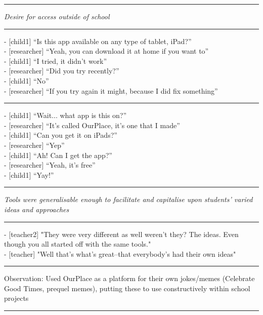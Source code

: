 \par\noindent\rule{\textwidth}{1pt}

\textit{Desire for access outside of school}

\par\noindent\rule{\textwidth}{1pt}

- [child1] “Is this app available on any type of tablet, iPad?”\\
- [researcher] “Yeah, you can download it at home if you want to”\\
- [child1] “I tried, it didn’t work”\\
- [researcher] “Did you try recently?”\\
- [child1] “No”\\
- [researcher] “If you try again it might, because I did fix something”

{\centering
  \noindent\rule{0.5\textwidth}{0.4pt}\par
}

- [child1] “Wait... what app is this on?”\\
- [researcher] “It’s called OurPlace, it’s one that I made”\\
- [child1] “Can you get it on iPads?”\\
- [researcher] “Yep”\\
- [child1] “Ah! Can I get the app?”\\
- [researcher] “Yeah, it’s free”\\
- [child1] “Yay!”

\par\noindent\rule{\textwidth}{1pt}

\textit{Tools were generalisable enough to facilitate and capitalise upon students’ varied ideas and approaches}

\par\noindent\rule{\textwidth}{1pt}

- [teacher2] "They were very different as well weren't they? The ideas. Even though you all started off with the same tools."\\
- [teacher] "Well that's what's great--that everybody's had their own ideas"

{\centering
  \noindent\rule{0.5\textwidth}{0.4pt}\par
}

Observation: Used OurPlace as a platform for their own jokes/memes (Celebrate Good Times, prequel memes), putting these to use constructively within school projects

\par\noindent\rule{\textwidth}{1pt}

